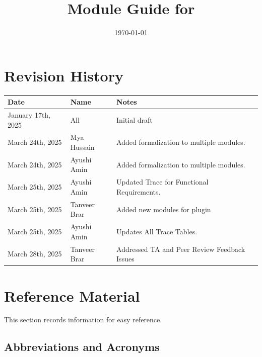 \documentclass[12pt, titlepage]{article}
\begin{document}
\title{Module Guide for \progname{}} 
\author{\authname}
\date{\today}

\maketitle


\section{Revision History}

\begin{tabularx}{\textwidth}{p{3cm}p{2cm}X}
\toprule {\bf Date} & {\bf Name} & {\bf Notes}\\
\midrule
January 17th, 2025 & All & Initial draft\\
March 24th, 2025 & Mya Hussain & Added formalization to multiple modules. \\
March 24th, 2025 & Ayushi Amin & Added formalization to multiple modules. \\
March 25th, 2025 & Ayushi Amin & Updated Trace for Functional Requirements. \\
March 25th, 2025 & Tanveer Brar & Added new modules for plugin \\
March 25th, 2025 & Ayushi Amin & Updates All Trace Tables. \\
March 28th, 2025 & Tanveer Brar & Addressed TA and Peer Review Feedback Issues\\
\bottomrule
\end{tabularx}

\newpage


\section{Reference Material}

This section records information for easy reference.

\subsection{Abbreviations and Acronyms}
\end{document}
